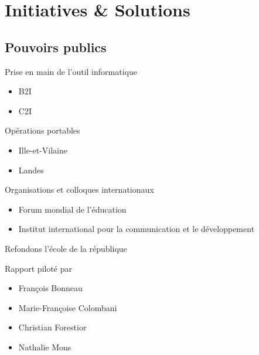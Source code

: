 \section{Initiatives \& Solutions}

\subsection{Pouvoirs publics}

\begin{frame}{Prise en main de l'outil informatique}
	  \begin{itemize}
	  \item B2I
	  \item C2I
	  \end{itemize}
\end{frame}

\begin{frame}{Opérations portables}
	  \begin{itemize}
	  \item Ille-et-Vilaine
	  \item Landes
	  \end{itemize}
\end{frame}

\begin{frame}{Organisations et colloques internationaux}
	  \begin{itemize}
	  \item Forum mondial de l'éducation
	  \item Institut international pour la communication et le développement
	  \end{itemize}
\end{frame}

\begin{frame}{Refondons l'école de la république}

\begin{block}{Rapport piloté par}
  \begin{itemize}
  \item François Bonneau
  \item Marie-Françoise Colombani
  \item Christian Forestior
  \item Nathalie Mons
  \end{itemize}
\end{block}

\end{frame}


